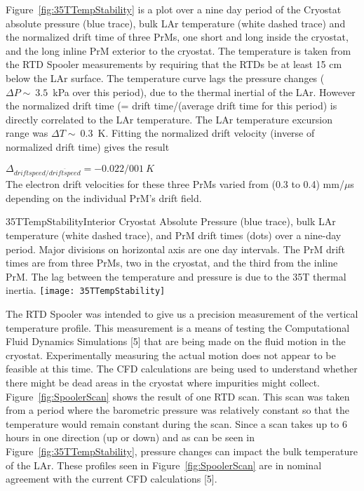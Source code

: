 Figure~\ref{fig:35TTempStability} is a plot over a nine day period of the Cryostat absolute pressure (blue 
trace), bulk LAr temperature (white dashed trace) and the normalized drift time of three PrMs, one short 
and long inside the cryostat, and the long inline PrM exterior to the cryostat. The temperature is taken 
from the RTD Spooler measurements by requiring that the RTDs be at least 15 cm below the LAr surface. 
The temperature curve lags the pressure changes ($\Delta P \sim~3.5$~kPa over this period), due to the thermal 
inertial of the LAr. However the normalized drift time (= drift time/(average drift time for this period) is 
directly correlated to the LAr temperature. The LAr temperature excursion range was $\Delta T \sim~0.3$~K. 
Fitting the normalized drift velocity (inverse of normalized drift time) gives the result 


 $\Delta_{driftspeed/\overline{driftspeed}} = -0.022/001~K$\\
 
The electron drift velocities for these three PrMs varied from (0.3 to 0.4) mm/$\mu$s depending on the individual PrM's drift field. 

\begin{cdrfigure}{35TTempStability}{Interior Cryostat Absolute Pressure 
(blue trace), bulk LAr temperature (white dashed trace), and PrM drift times (dots) over a nine-day period. 
Major divisions on horizontal axis are one day intervals. The PrM drift times are from three PrMs, two in 
the cryostat, and the third from the inline PrM. The lag between the temperature and pressure is due to 
the 35T thermal inertia.}
  \texttt{[image: 35TTempStability]}
\end{cdrfigure}

The RTD Spooler was intended to give us a precision measurement of the vertical temperature profile. 
This measurement is a means of testing the Computational Fluid Dynamics Simulations [5]\fixme{} that 
are being made on the fluid motion in the cryostat. Experimentally measuring the actual motion does not 
appear to be feasible at this time. The CFD calculations are being used to understand whether there 
might be dead areas in the cryostat where impurities might collect. Figure~\ref{fig:SpoolerScan} shows the result of one RTD 
scan. This scan was taken from a period where the barometric pressure was relatively constant so that 
the temperature would remain constant during the scan. Since a scan takes up to 6 hours in one direction 
(up or down) and as can be seen in Figure~\ref{fig:35TTempStability}, pressure changes can impact the 
bulk temperature of the LAr. These profiles seen in Figure~\ref{fig:SpoolerScan} are in nominal 
agreement with the current CFD calculations [5\fixme{}].


